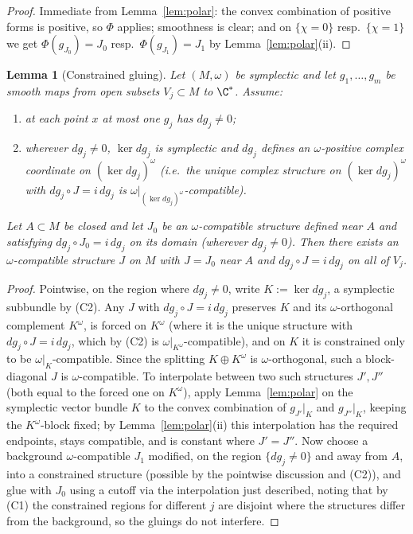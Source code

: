 \documentclass[11pt]{amsart}
\theoremstyle{plain}
\newtheorem{lemma}[theorem]{Lemma}
\theoremstyle{definition}
\begin{document}
\begin{proof}
Immediate from Lemma~\ref{lem:polar}: the convex combination of positive
forms is positive, so $\Phi$ applies; smoothness is clear; and on
$\{\chi=0\}$ resp.\ $\{\chi=1\}$ we get $\Phi(g_{J_0})=J_0$ resp.\
$\Phi(g_{J_1})=J_1$ by Lemma~\ref{lem:polar}(ii).
\end{proof}

\begin{lemma}[Constrained gluing]\label{lem:constrained}
Let $(M,\omega)$ be symplectic and let $g_1,\dots,g_m$ be smooth maps from
open subsets $V_j\subset M$ to $\C^*$. Assume:
\begin{enumerate}
\item[(C1)] at each point $x$ at most one $g_j$ has $dg_j\neq0$;
\item[(C2)] wherever $dg_j\neq0$, $\ker dg_j$ is symplectic and
$dg_j$ defines an $\omega$-positive complex coordinate on
$(\ker dg_j)^{\omega}$ (i.e.\ the unique complex structure on
$(\ker dg_j)^\omega$ with $dg_j\circ J=i\,dg_j$ is
$\omega|_{(\ker dg_j)^\omega}$-compatible).
\end{enumerate}
Let $A\subset M$ be closed and let $J_0$ be an $\omega$-compatible structure
defined near $A$ and satisfying $dg_j\circ J_0=i\,dg_j$ on its domain
(wherever $dg_j\neq0$). Then there exists an $\omega$-compatible structure $J$
on $M$ with $J=J_0$ near $A$ and $dg_j\circ J=i\,dg_j$ on all of $V_j$.
\end{lemma}

\begin{proof}
Pointwise, on the region where $dg_j\neq0$, write
$K:=\ker dg_j$, a symplectic subbundle by (C2). Any $J$ with
$dg_j\circ J=i\,dg_j$ preserves $K$ and its $\omega$-orthogonal complement
$K^\omega$, is forced on $K^\omega$ (where it is the unique structure with
$dg_j\circ J=i\,dg_j$, which by (C2) is
$\omega|_{K^\omega}$-compatible), and on $K$ it is constrained only to be
$\omega|_K$-compatible. Since the splitting $K\oplus K^\omega$ is
$\omega$-orthogonal, such a block-diagonal $J$ is $\omega$-compatible. To
interpolate between two such structures $J',J''$ (both equal to the forced
one on $K^\omega$), apply Lemma~\ref{lem:polar} on the symplectic vector
bundle $K$ to the convex combination of $g_{J'}|_K$ and $g_{J''}|_K$, keeping
the $K^\omega$-block fixed; by Lemma~\ref{lem:polar}(ii) this interpolation
has the required endpoints, stays compatible, and is constant where
$J'=J''$. Now choose a background $\omega$-compatible $J_1$ modified, on the
region $\{dg_j\neq0\}$ and away from $A$, into a constrained structure (possible
by the pointwise discussion and (C2)), and glue with $J_0$ using a cutoff via
the interpolation just described, noting that by (C1) the constrained regions
for different $j$ are disjoint where the structures differ from the
background, so the gluings do not interfere.
\end{proof}
\end{document}
